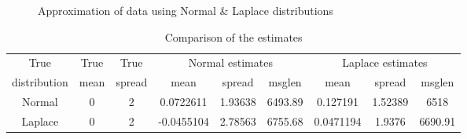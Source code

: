 \documentclass[wcp]{jmlr}
\begin{document}
\begin{figure}[!htb]
  \centering
    \hspace{0.5cm}
    \caption{Approximation of data using Normal \& Laplace distributions}
    \label{fig:data_approximation}
\end{figure}

\begin{table}[h]
\centering
\caption{Comparison of the estimates}
\label{tab:comparison_estimates}
\begin{tabular}{|c|c|c|c|c|c|c|c|c|}
\hline
True & True & True & \multicolumn{3}{c|}{Normal estimates} & \multicolumn{3}{c|}{Laplace estimates} \\ \cline{4-9} 
distribution & mean & spread & mean & spread & msglen & mean & spread & msglen \\ \hline 
Normal & 0 & 2 & 0.0722611 & 1.93638 & 6493.89 & 0.127191 & 1.52389 & 6518 \\ \hline
Laplace & 0 & 2 & -0.0455104 & 2.78563 & 6755.68 & 0.0471194 & 1.9376 & 6690.91 \\ \hline
\end{tabular}
\end{table}
\end{document}
